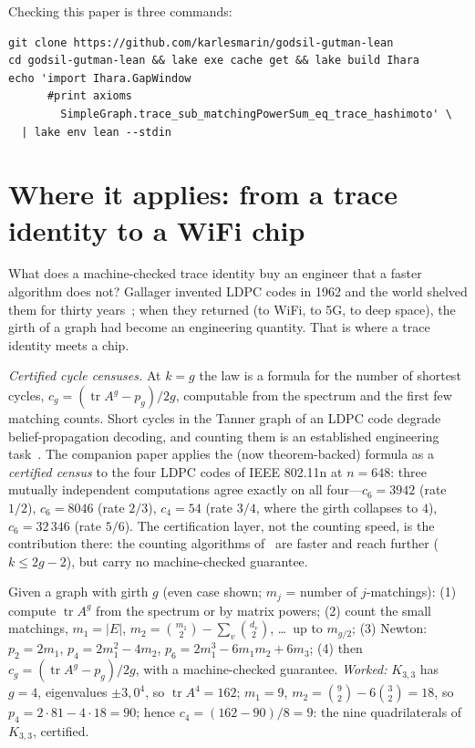 \documentclass[11pt]{article}
\DeclareMathOperator{\tr}{tr}
\begin{document}
Checking this paper is three commands:
\begin{tcolorbox}[colframe=ggteal!70,colback=ggband!20,arc=3pt,boxrule=0.8pt]
\footnotesize\begin{verbatim}
git clone https://github.com/karlesmarin/godsil-gutman-lean
cd godsil-gutman-lean && lake exe cache get && lake build Ihara
echo 'import Ihara.GapWindow
      #print axioms
        SimpleGraph.trace_sub_matchingPowerSum_eq_trace_hashimoto' \
  | lake env lean --stdin
\end{verbatim}
\end{tcolorbox}

\section{Where it applies: from a trace identity to a WiFi chip}
\label{sec:applications}

What does a machine-checked trace identity buy an engineer that a faster algorithm does not?
Gallager invented LDPC codes in 1962 and the world shelved them for thirty
years~\cite{Gallager1962}; when they returned (to WiFi, to 5G, to deep space), the girth of
a graph had become an engineering quantity. That is where a trace identity meets a chip.

\emph{Certified cycle censuses.} At $k = g$ the law is a formula for the number of shortest
cycles, $c_g = (\tr A^g - p_g)/2g$, computable from the spectrum and the first few matching
counts. Short cycles in the Tanner graph of an LDPC code degrade belief-propagation
decoding, and counting them is an established engineering task~\cite{KarimiBanihashemi2013,
BlakeLin2018}. The companion paper applies the (now theorem-backed) formula as a
\emph{certified census} to the four LDPC codes of IEEE 802.11n at $n = 648$: three mutually
independent computations agree exactly on all four---$c_6 = 3942$ (rate $1/2$), $c_6 = 8046$
(rate $2/3$), $c_4 = 54$ (rate $3/4$, where the girth collapses to $4$), $c_6 = 32\,346$
(rate $5/6$). The certification layer, not the counting speed, is the contribution there:
the counting algorithms of~\cite{KarimiBanihashemi2013,BlakeLin2018} are faster and reach
further ($k \le 2g-2$), but carry no machine-checked guarantee.

\begin{tcolorbox}[colframe=ggamber,colback=ggamber!8,arc=3pt,boxrule=0.8pt,
  title=\textbf{The recipe: count your graph's shortest cycles in four lines},
  coltitle=white,colbacktitle=ggamber]
Given a graph with girth $g$ (even case shown; $m_j$ = number of $j$-matchings):
(1) compute $\tr A^g$ from the spectrum or by matrix powers;
(2) count the small matchings, $m_1 = |E|$, $m_2 = \binom{m_1}{2} - \sum_v \binom{d_v}{2}$,
\dots\ up to $m_{g/2}$;
(3) Newton: $p_2 = 2m_1$, $p_4 = 2m_1^2 - 4m_2$, $p_6 = 2m_1^3 - 6m_1m_2 + 6m_3$;
(4) then $c_g = (\tr A^g - p_g)/2g$, with a machine-checked guarantee.
\emph{Worked:} $K_{3,3}$ has $g = 4$, eigenvalues $\pm 3, 0^4$, so $\tr A^4 = 162$;
$m_1 = 9$, $m_2 = \binom92 - 6\binom32 = 18$, so $p_4 = 2\cdot 81 - 4\cdot 18 = 90$;
hence $c_4 = (162 - 90)/8 = 9$: the nine quadrilaterals of $K_{3,3}$, certified.
\end{tcolorbox}
\end{document}
